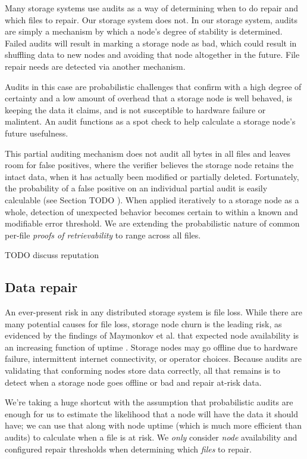 \documentclass[a4paper,10pt]{article} \usepackage[utf8]{inputenc}
\newcommand{\todo}[1]{{\color{red} TODO #1 }}
\begin{document}
Many storage systems use audits as a way of determining when to do repair and
which files to repair. Our storage system does not. In our storage system,
audits are simply a mechanism by which a node's degree of stability is
determined. Failed audits will result in marking a storage node as bad, which
could result in shuffling data to new nodes and avoiding that node altogether
in the future. File repair needs are detected via another mechanism.

Audits in this case are probabilistic challenges that confirm with a high
degree of certainty and a low amount of overhead that a storage node is well
behaved, is keeping the data it claims, and is not susceptible to hardware
failure or malintent. An audit functions as a spot check to help calculate a
storage node's future usefulness.

This partial auditing mechanism does not audit all bytes in all files and
leaves room for false positives, where the verifier believes the storage node
retains the intact data, when it has actually been modified or partially
deleted. Fortunately, the probability of a false positive on an individual
partial audit is easily calculable (see Section \todo{}). When applied
iteratively to a storage node as a whole, detection of unexpected behavior
becomes certain to within a known and modifiable error threshold.
We are extending the probabilistic nature of
common per-file {\em proofs of retrievability} \cite{proof-of-retrievability}
to range across all files.

\todo{discuss reputation}

\subsection{Data repair}

An ever-present risk in any distributed storage system is file loss. While there
are many potential causes for file loss, storage node churn is the leading
risk, as evidenced by the findings of Maymonkov et al. that expected node
availability is an increasing function of uptime \cite{kad}. Storage nodes
may go offline due to hardware failure, intermittent internet connectivity, or
operator choices.
Because audits are validating that conforming nodes store data correctly, all
that remains is to detect when a storage node goes offline or bad and repair
at-risk data.

We're taking a huge shortcut with the assumption that
probabilistic audits are enough for us to estimate the likelihood that a node
will have the data it should have; we can use that
along with node uptime (which is much more efficient than audits)
to calculate when a file is at risk.
We {\em only} consider {\em node} availability and configured repair thresholds
when determining which {\em files} to repair.
\end{document}
